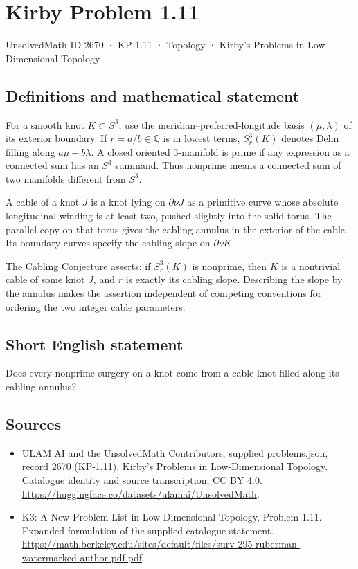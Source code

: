 \documentclass[11pt,a4paper]{article}
\begin{document}
\section*{Kirby Problem 1.11}\label{2670}
{\small UnsolvedMath ID 2670 · KP-1.11 · Topology · Kirby's Problems in Low-Dimensional Topology}
\subsection{Definitions and mathematical statement}
For a smooth knot $K\subset S^3$, use the meridian--preferred-longitude basis
$(\mu,\lambda)$ of its exterior boundary. If $r=a/b\in\mathbb Q$ is in lowest
terms, $S^3_r(K)$ denotes Dehn filling along $a\mu+b\lambda$.
A closed oriented $3$-manifold is prime if any expression as a connected sum has
an $S^3$ summand. Thus nonprime means a connected sum of two manifolds different
from $S^3$.

A cable of a knot $J$ is a knot lying on $\partial\nu J$ as a primitive curve
whose absolute longitudinal winding is at least two, pushed slightly into the
solid torus. The parallel copy on that torus gives the cabling annulus in the
exterior of the cable. Its boundary curves specify the cabling slope on
$\partial\nu K$.

The Cabling Conjecture asserts: if $S^3_r(K)$ is nonprime, then $K$ is a nontrivial
cable of some knot $J$, and $r$ is exactly its cabling slope. Describing the slope
by the annulus makes the assertion independent of competing conventions for
ordering the two integer cable parameters.
\subsection{Short English statement}
Does every nonprime surgery on a knot come from a cable knot filled along its cabling annulus?
\subsection{Sources}
\begin{itemize}
\item[S1] ULAM.AI and the UnsolvedMath Contributors, supplied problems.json, record 2670 (KP-1.11), Kirby's Problems in Low-Dimensional Topology. Catalogue identity and source transcription; CC BY 4.0.
\url{https://huggingface.co/datasets/ulamai/UnsolvedMath}.
\item[S2] K3: A New Problem List in Low-Dimensional Topology, Problem 1.11. Expanded formulation of the supplied catalogue statement.
\url{https://math.berkeley.edu/sites/default/files/surv-295-ruberman-watermarked-author-pdf.pdf}.
\end{itemize}
\end{document}
